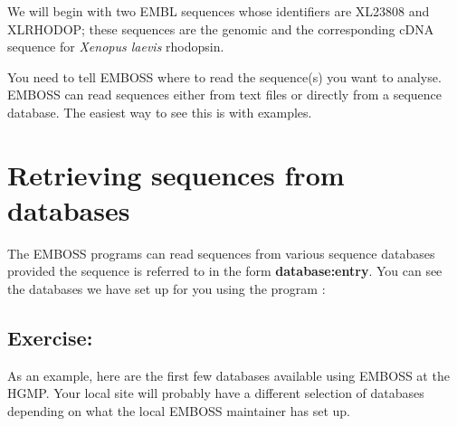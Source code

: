 \documentclass[12pt]{report}
\begin{document}
We will begin with two EMBL sequences whose identifiers are XL23808
and XLRHODOP; these sequences are the genomic and the corresponding
cDNA sequence for {\em Xenopus laevis} rhodopsin. 

You need to tell EMBOSS where to read the sequence(s) you want to
analyse. EMBOSS can read sequences either from text files or directly
from a sequence database. The easiest way to see this is with examples.

\section{Retrieving sequences from databases}
The EMBOSS programs can read sequences from various sequence databases
provided the sequence is referred to in the form {\bf
database:entry}. You can see the databases we have set up for you using the program
:

\subsection*{Exercise: }

As an example, here are the first few databases available using EMBOSS
at the HGMP. Your local site will probably have a different selection
of databases depending on what the local EMBOSS maintainer has set up.

\unix{}\\
\end{document}
